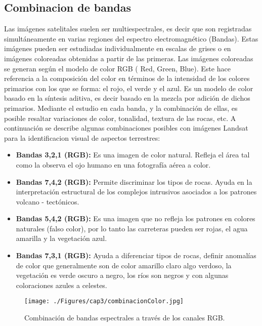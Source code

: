 \subsection{Combinacion de bandas}
Las im\'agenes satelitales suelen ser multiespectrales, es decir que son registradas simult\'aneamente en varias regiones del espectro electromagn\'etico (Bandas). Estas im\'agenes pueden ser estudiadas individualmente en escalas de grises o en im\'agenes coloreadas obtenidas a partir de las primeras. Las im\'agenes coloreadas se generan seg\'un el modelo de color RGB ( Red, Green, Blue). Este hace referencia a la composici\'on del color en t\'erminos de la intensidad de los colores primarios con los que se forma: el rojo, el verde y el azul. Es un modelo de color basado en la s\'intesis aditiva, es decir basado en la mezcla por adici\'on de dichos primarios\cite{teledet2015Combi}.
Mediante el estudio en cada banda, y la combinaci\'on de ellas, es posible resaltar variaciones de color, tonalidad, textura de las rocas, etc. A continuaci\'on se describe algunas combinaciones posibles con im\'agenes Landsat para la identificacion visual de aspectos terrestres\cite{lillesand2014remote}:
	\begin{itemize}
		\item \textbf{Bandas 3,2,1 (RGB):} Es una imagen de color natural. Refleja el \'area tal como la observa el ojo humano en una fotograf\'ia a\'erea a color.
		\item  \textbf{Bandas 7,4,2 (RGB):} Permite discriminar los tipos de rocas. Ayuda en la interpretaci\'on estructural de los complejos intrusivos asociados a los patrones volcano - tect\'onicos.
		\item  \textbf{Bandas 5,4,2 (RGB):} Es una imagen que no refleja los patrones en colores naturales (falso color), por lo tanto las carreteras pueden ser rojas, el agua amarilla y la vegetaci\'on azul.
		\item \textbf{Bandas 7,3,1 (RGB):} Ayuda a diferenciar tipos de rocas, definir anomal\'ias de color que generalmente son de color amarillo claro algo verdoso, la vegetaci\'on es verde oscuro a negro, los r\'ios son negros y con algunas coloraciones azules a celestes.		
	\end{itemize}
 
  \begin{figure}[H]
  	\centering
  	\texttt{[image: ./Figures/cap3/combinacionColor.jpg]}
  	\caption{Combinaci\'on de bandas espectrales a trav\'es de los canales RGB.}
  	\label{fig:combinacionColor}
  \end{figure}

